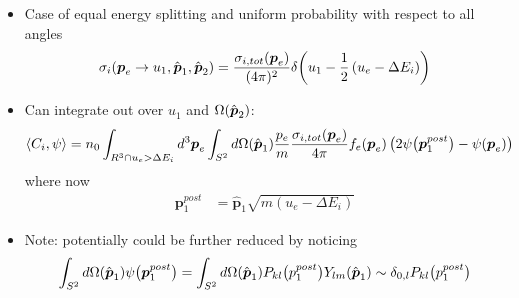 \documentclass[mathserif, aspectratio=169]{beamer}
\newcommand{\vect}[1]{\boldsymbol{#1}}
\newcommand{\of}[1]{\mleft( #1 \mright)}
\begin{document}
\begin{frame}
\begin{itemize}
\item Case of equal energy splitting and uniform probability with respect to all angles
\begin{align*}
\sigma_{i} \of{ \vect{p}_{e} \rightarrow u_{1}, \hat{\vect{p}}_{1}, \hat{\vect{p}}_{2}}
=
\frac{\sigma_{i,tot} \of{ \vect{p}_{e} }}{(4\pi)^2} \delta\of{u_1 - \frac12 \left( u_{e} - \Delta E_i \right)}
\end{align*}
\item Can integrate out over $u_1$ and $\Omega\of{\hat{\vect{p}}_2}$:
\begin{align*}
\left< C_i, \psi \right> 
= 
n_0
\int_{R^3 \cap u_e > \Delta E_i} d^3 \vect{p}_e
\int_{S^2} d\Omega\of{\hat{\vect{p}}_1}
\frac{ p_{e} }{ m }
\frac{\sigma_{i,tot} \of{ \vect{p}_{e} }}{4\pi}
f_e\of{\vect{p}_e} \left( 2\psi\of{\vect{p}_1^{post}}  
- \psi\of{\vect{p}_e} \right)
\end{align*}
where now
\begin{align*}
\vect{p}_1^{post} &= \hat{\vect{p}}_1 \sqrt{m \left( u_{e} - \Delta E_i \right)}
\end{align*}

\item Note: potentially could be further reduced by noticing
\begin{align*}
\int_{S^2} d\Omega\of{\hat{\vect{p}}_1} \psi\of{\vect{p}_1^{post}} =
\int_{S^2} d\Omega\of{\hat{\vect{p}}_1} P_{kl} \of{p_1^{post}} Y_{lm}\of{\hat{\vect{p}}_1} 
\sim \delta_{0,l} P_{kl} \of{p_1^{post}}
\end{align*}

\end{itemize}
\end{frame}




\end{document}
